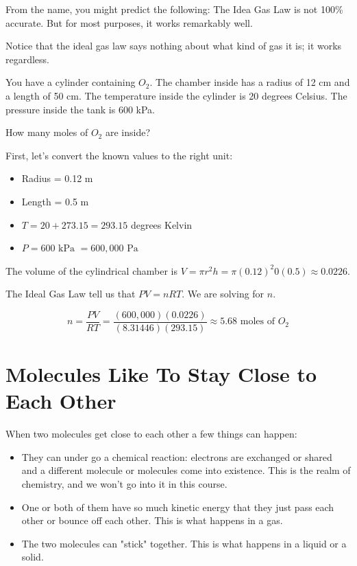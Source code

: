 From the name,  you might predict the following: The Idea Gas Law is not 100\% accurate.   But for most purposes,  it works remarkably well.  

Notice that the ideal gas law says nothing about what kind of gas it is; it works regardless.

\begin{Exercise}[title={Ideal Gas Law},  label=ideal_gas]
  
You have a cylinder containing $O_2$.  The chamber inside has a radius of 12 cm and a length of 50 cm.  
The temperature inside the cylinder is 20 degrees Celsius.
The pressure inside the tank is 600 kPa.

How many moles of $O_2$ are inside?

\end{Exercise}
\begin{Answer}[ref=ideal_gas]

First, let's convert the known values to the right unit:
\begin{itemize}
\item Radius = 0.12 m
\item Length = 0.5 m
\item $T = 20 + 273.15 = 293.15$ degrees Kelvin
\item $P = 600 \text{ kPa } = 600,000 \text{ Pa }$
\end{itemize}

The volume of the cylindrical chamber is $V = \pi r^2 h = \pi (0.12)^2 0 (0.5) \approx 0.0226$.

The Ideal Gas Law tell us that $PV = nRT$.  We are solving for $n$.

$$n = \frac{PV}{RT} = \frac{(600,000)(0.0226)}{(8.31446)(293.15)} \approx 5.68 \text{ moles of } O_2$$

\end{Answer}


\section{Molecules Like To Stay Close to Each Other}

When two molecules get close to each other a few things can happen:
\begin{itemize}  
\item They can under go a chemical reaction: electrons are exchanged or shared and a different molecule or molecules come into existence.  
This is the realm of chemistry, and we won't go into it in this course.
\item One or both of them have so much kinetic energy that they just pass each other or bounce off each other.  This is what happens in a gas.
\item The two molecules can "stick" together.  This is what happens in a liquid or a solid.
\end{itemize}


